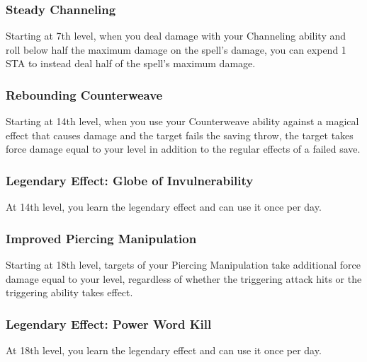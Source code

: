\subsubsection{Steady Channeling}
Starting at 7th level, when you deal damage with your Channeling ability and roll below half the maximum damage on the spell's damage, you can expend 1 STA to instead deal half of the spell's maximum damage.

\subsubsection{Rebounding Counterweave}
Starting at 14th level, when you use your Counterweave ability against a magical effect that causes damage and the target fails the saving throw, the target takes force damage equal to your level in addition to the regular effects of a failed save.

\subsubsection{Legendary Effect: Globe of Invulnerability}
At 14th level, you learn the legendary effect  and can use it once per day.

\subsubsection{Improved Piercing Manipulation}
Starting at 18th level, targets of your Piercing Manipulation take additional force damage equal to your level, regardless of whether the triggering attack hits or the triggering ability takes effect.

\subsubsection{Legendary Effect: Power Word Kill}
At 18th level, you learn the legendary effect  and can use it once per day.

